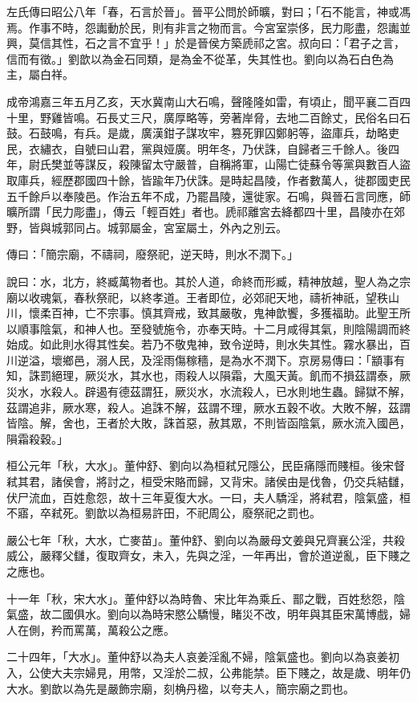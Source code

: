 \begin{pinyinscope}
左氏傳曰昭公八年「春，石言於晉」。晉平公問於師曠，對曰；「石不能言，神或馮焉。作事不時，怨讟動於民，則有非言之物而言。今宮室崇侈，民力彫盡，怨讟並興，莫信其性，石之言不宜乎！」於是晉侯方築虒祁之宮。叔向曰：「君子之言，信而有徵。」劉歆以為金石同類，是為金不從革，失其性也。劉向以為石白色為主，屬白祥。

成帝鴻嘉三年五月乙亥，天水冀南山大石鳴，聲隆隆如雷，有頃止，聞平襄二百四十里，野雞皆鳴。石長丈三尺，廣厚略等，旁著岸脅，去地二百餘丈，民俗名曰石鼓。石鼓鳴，有兵。是歲，廣漢鉗子謀攻牢，篡死罪囚鄭躬等，盜庫兵，劫略吏民，衣繡衣，自號曰山君，黨與娅廣。明年冬，乃伏誅，自歸者三千餘人。後四年，尉氏樊並等謀反，殺陳留太守嚴普，自稱將軍，山陽亡徒蘇令等黨與數百人盜取庫兵，經歷郡國四十餘，皆踰年乃伏誅。是時起昌陵，作者數萬人，徙郡國吏民五千餘戶以奉陵邑。作治五年不成，乃罷昌陵，還徙家。石鳴，與晉石言同應，師曠所謂「民力彫盡」，傳云「輕百姓」者也。虒祁離宮去絳都四十里，昌陵亦在郊野，皆與城郭同占。城郭屬金，宮室屬土，外內之別云。

傳曰：「簡宗廟，不禱祠，廢祭祀，逆天時，則水不潤下。」

說曰：水，北方，終臧萬物者也。其於人道，命終而形臧，精神放越，聖人為之宗廟以收魂氣，春秋祭祀，以終孝道。王者即位，必郊祀天地，禱祈神祇，望秩山川，懷柔百神，亡不宗事。慎其齊戒，致其嚴敬，鬼神歆饗，多獲福助。此聖王所以順事陰氣，和神人也。至發號施令，亦奉天時。十二月咸得其氣，則陰陽調而終始成。如此則水得其性矣。若乃不敬鬼神，致令逆時，則水失其性。霧水暴出，百川逆溢，壞鄉邑，溺人民，及淫雨傷稼穡，是為水不潤下。京房易傳曰：「顓事有知，誅罰絕理，厥災水，其水也，雨殺人以隕霜，大風天黃。飢而不損茲謂泰，厥災水，水殺人。辟遏有德茲謂狂，厥災水，水流殺人，已水則地生蟲。歸獄不解，茲謂追非，厥水寒，殺人。追誅不解，茲謂不理，厥水五穀不收。大敗不解，茲謂皆陰。解，舍也，王者於大敗，誅首惡，赦其眾，不則皆函陰氣，厥水流入國邑，隕霜殺穀。」

桓公元年「秋，大水」。董仲舒、劉向以為桓弒兄隱公，民臣痛隱而賤桓。後宋督弒其君，諸侯會，將討之，桓受宋賂而歸，又背宋。諸侯由是伐魯，仍交兵結讎，伏尸流血，百姓愈怨，故十三年夏復大水。一曰，夫人驕淫，將弒君，陰氣盛，桓不寤，卒弒死。劉歆以為桓易許田，不祀周公，廢祭祀之罰也。

嚴公七年「秋，大水，亡麥苗」。董仲舒、劉向以為嚴母文姜與兄齊襄公淫，共殺威公，嚴釋父讎，復取齊女，未入，先與之淫，一年再出，會於道逆亂，臣下賤之之應也。

十一年「秋，宋大水」。董仲舒以為時魯、宋比年為乘丘、鄑之戰，百姓愁怨，陰氣盛，故二國俱水。劉向以為時宋愍公驕慢，睹災不改，明年與其臣宋萬博戲，婦人在側，矜而罵萬，萬殺公之應。

二十四年，「大水」。董仲舒以為夫人哀姜淫亂不婦，陰氣盛也。劉向以為哀姜初入，公使大夫宗婦見，用幣，又淫於二叔，公弗能禁。臣下賤之，故是歲、明年仍大水。劉歆以為先是嚴飾宗廟，刻桷丹楹，以夸夫人，簡宗廟之罰也。


\end{pinyinscope}
